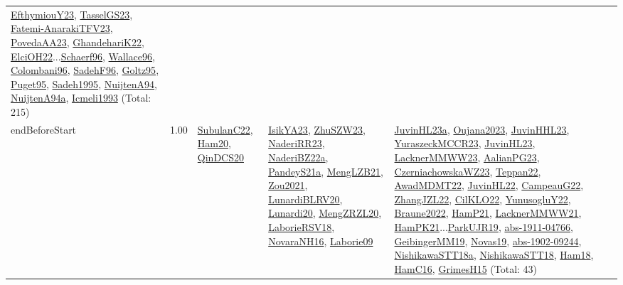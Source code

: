 {\begin{longtable}{p{3cm}r>{\raggedright\arraybackslash}p{6cm}>{\raggedright\arraybackslash}p{6cm}>{\raggedright\arraybackslash}p{8cm}}
\hyperref[detail:EfthymiouY23]{EfthymiouY23}, \hyperref[detail:TasselGS23]{TasselGS23}, \hyperref[detail:Fatemi-AnarakiTFV23]{Fatemi-AnarakiTFV23}, \hyperref[detail:PovedaAA23]{PovedaAA23}, \hyperref[detail:GhandehariK22]{GhandehariK22}, \hyperref[detail:ElciOH22]{ElciOH22}...\hyperref[detail:Schaerf96]{Schaerf96}, \hyperref[detail:Wallace96]{Wallace96}, \hyperref[detail:Colombani96]{Colombani96}, \hyperref[detail:SadehF96]{SadehF96}, \hyperref[detail:Goltz95]{Goltz95}, \hyperref[detail:Puget95]{Puget95}, \hyperref[detail:Sadeh1995]{Sadeh1995}, \hyperref[detail:NuijtenA94]{NuijtenA94}, \hyperref[detail:NuijtenA94a]{NuijtenA94a}, \hyperref[detail:Icmeli1993]{Icmeli1993} (Total: 215)\\
\index{endBeforeStart}\index{Constraints!endBeforeStart}endBeforeStart &  1.00 & \hyperref[detail:SubulanC22]{SubulanC22}, \hyperref[detail:Ham20]{Ham20}, \hyperref[detail:QinDCS20]{QinDCS20} & \hyperref[detail:IsikYA23]{IsikYA23}, \hyperref[detail:ZhuSZW23]{ZhuSZW23}, \hyperref[detail:NaderiRR23]{NaderiRR23}, \hyperref[detail:NaderiBZ22a]{NaderiBZ22a}, \hyperref[detail:PandeyS21a]{PandeyS21a}, \hyperref[detail:MengLZB21]{MengLZB21}, \hyperref[detail:Zou2021]{Zou2021}, \hyperref[detail:LunardiBLRV20]{LunardiBLRV20}, \hyperref[detail:Lunardi20]{Lunardi20}, \hyperref[detail:MengZRZL20]{MengZRZL20}, \hyperref[detail:LaborieRSV18]{LaborieRSV18}, \hyperref[detail:NovaraNH16]{NovaraNH16}, \hyperref[detail:Laborie09]{Laborie09} & \hyperref[detail:JuvinHL23a]{JuvinHL23a}, \hyperref[detail:Oujana2023]{Oujana2023}, \hyperref[detail:JuvinHHL23]{JuvinHHL23}, \hyperref[detail:YuraszeckMCCR23]{YuraszeckMCCR23}, \hyperref[detail:JuvinHL23]{JuvinHL23}, \hyperref[detail:LacknerMMWW23]{LacknerMMWW23}, \hyperref[detail:AalianPG23]{AalianPG23}, \hyperref[detail:CzerniachowskaWZ23]{CzerniachowskaWZ23}, \hyperref[detail:Teppan22]{Teppan22}, \hyperref[detail:AwadMDMT22]{AwadMDMT22}, \hyperref[detail:JuvinHL22]{JuvinHL22}, \hyperref[detail:CampeauG22]{CampeauG22}, \hyperref[detail:ZhangJZL22]{ZhangJZL22}, \hyperref[detail:CilKLO22]{CilKLO22}, \hyperref[detail:YunusogluY22]{YunusogluY22}, \hyperref[detail:Braune2022]{Braune2022}, \hyperref[detail:HamP21]{HamP21}, \hyperref[detail:LacknerMMWW21]{LacknerMMWW21}, \hyperref[detail:HamPK21]{HamPK21}...\hyperref[detail:ParkUJR19]{ParkUJR19}, \hyperref[detail:abs-1911-04766]{abs-1911-04766}, \hyperref[detail:GeibingerMM19]{GeibingerMM19}, \hyperref[detail:Novas19]{Novas19}, \hyperref[detail:abs-1902-09244]{abs-1902-09244}, \hyperref[detail:NishikawaSTT18a]{NishikawaSTT18a}, \hyperref[detail:NishikawaSTT18]{NishikawaSTT18}, \hyperref[detail:Ham18]{Ham18}, \hyperref[detail:HamC16]{HamC16}, \hyperref[detail:GrimesH15]{GrimesH15} (Total: 43)\\

\end{longtable}}
